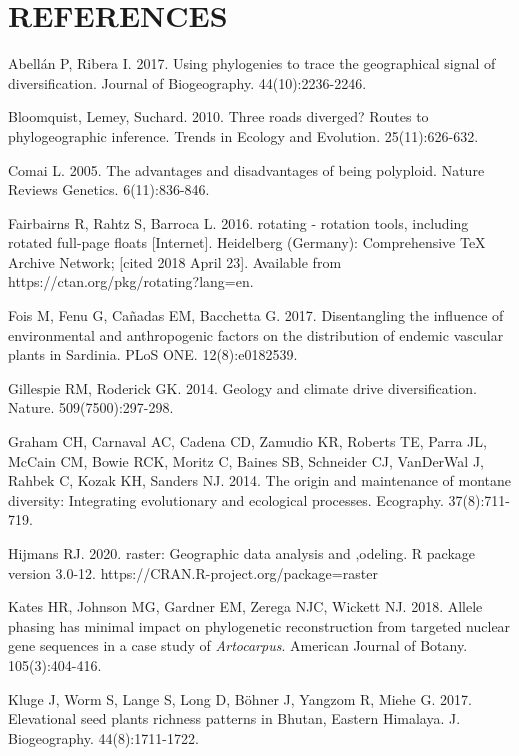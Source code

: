 \chapter*{REFERENCES}
\vspace*{-12pt}

\setlength{\parindent}{-4em}
\setlength{\leftskip}{4em}
\setlength{\parskip}{12pt}
\singlespacing

\hspace*{-4em}

Abellán P, Ribera I. 2017. Using phylogenies to trace the geographical signal of diversification. Journal of Biogeography. 44(10):2236-2246.

Bloomquist, Lemey, Suchard. 2010. Three roads diverged? Routes to phylogeographic inference. Trends in Ecology and Evolution. 25(11):626-632.

Comai L. 2005. The advantages and disadvantages of being polyploid. Nature Reviews Genetics. 6(11):836-846.

Fairbairns R, Rahtz S, Barroca L. 2016. rotating - rotation tools, including rotated full-page floats [Internet]. Heidelberg (Germany): Comprehensive TeX Archive Network; [cited 2018 April 23]. Available from https://ctan.org/pkg/rotating?lang=en.

Fois M, Fenu G, Cañadas EM, Bacchetta G. 2017. Disentangling the influence of environmental and anthropogenic factors on the distribution of endemic vascular plants in Sardinia. PLoS ONE. 12(8):e0182539.

Gillespie RM, Roderick GK. 2014. Geology and climate drive diversification. Nature. 509(7500):297-298.

Graham CH, Carnaval AC, Cadena CD, Zamudio KR, Roberts TE, Parra JL, McCain CM, Bowie RCK, Moritz C, Baines SB, Schneider CJ, VanDerWal J, Rahbek C, Kozak KH, Sanders NJ. 2014. The origin and maintenance of montane diversity: Integrating evolutionary and ecological processes. Ecography. 37(8):711-719.

Hijmans RJ. 2020. raster: Geographic data analysis and ,odeling. R package version 3.0-12. https://CRAN.R-project.org/package=raster

Kates HR, Johnson MG, Gardner EM, Zerega NJC, Wickett NJ. 2018. Allele phasing has minimal impact on phylogenetic reconstruction from targeted nuclear gene sequences in a case study of \textit{Artocarpus}. American Journal of Botany. 105(3):404-416.

Kluge J, Worm S, Lange S, Long D, Böhner J, Yangzom R, Miehe G. 2017. Elevational seed plants richness patterns in Bhutan, Eastern Himalaya. J. Biogeography. 44(8):1711-1722.

